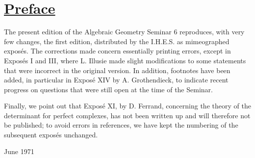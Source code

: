 \section*{\underline{Preface}}
The present edition of the Algebraic Geometry Seminar 6 reproduces, with very few changes, the first edition, distributed by the I.H.E.S. as mimeographed exposés. The corrections made concern essentially printing errors, except in Exposés I and III, where L. Illusie made slight modifications to some statements that were incorrect in the original version. In addition, footnotes have been added, in particular in Exposé XIV by A. Grothendieck, to indicate recent progress on questions that were still open at the time of the Seminar.

Finally, we point out that Exposé XI, by D. Ferrand, concerning the theory of the determinant for perfect complexes, has not been written up and will therefore not be published; to avoid errors in references, we have kept the numbering of the subsequent exposés unchanged.

\begin{flushright}June 1971\end{flushright}

